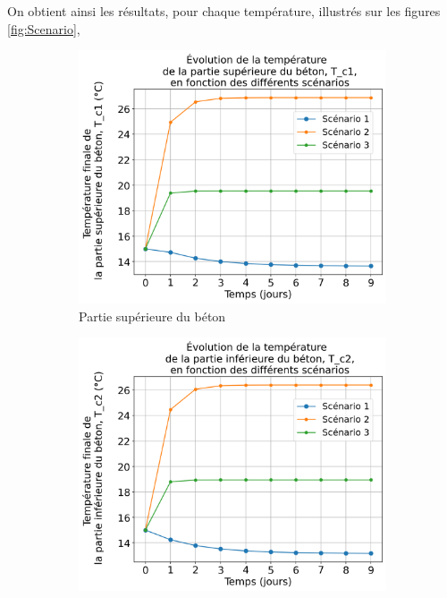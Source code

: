 \documentclass[12pt]{article}
\begin{document}
        On obtient ainsi les résultats, pour chaque température, illustrés sur les figures \ref{fig:Scenario},
        \begin{figure}
            \centering
            
            \begin{subfigure}{0.48\textwidth}
                \centering
                \includegraphics[width=1\linewidth]{Rapport/figures/T_c1.png}
                \caption{Partie supérieure du béton} 
                \label{fig:Tc1}
            \end{subfigure}
            \hfill
            \begin{subfigure}{0.48\textwidth}
                \centering
                \includegraphics[width=1\linewidth]{Rapport/figures/T_c2.png}

\end{subfigure}
\end{figure}
\end{document}
